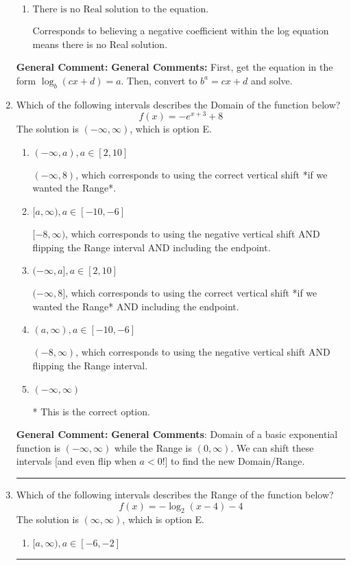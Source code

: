 \documentclass{extbook}[14pt]
\newcommand{\litem}[1]{\item #1

\rule{\textwidth}{0.4pt}}
\begin{document}
\begin{enumerate}
{\begin{enumerate}[label=\Alph*.]
$x = 5.000$, which corresponds to ignoring the vertical shift when converting to exponential form.
\item \( \text{There is no Real solution to the equation.} \)

Corresponds to believing a negative coefficient within the log equation means there is no Real solution.
\end{enumerate}

\textbf{General Comment:} \textbf{General Comments:} First, get the equation in the form $\log_b{(cx+d)} = a$. Then, convert to $b^a = cx+d$ and solve.
}
\litem{
Which of the following intervals describes the Domain of the function below?
\[ f(x) = -e^{x+3}+8 \]The solution is \( (-\infty, \infty) \), which is option E.\begin{enumerate}[label=\Alph*.]
\item \( (-\infty, a), a \in [2, 10] \)

$(-\infty, 8)$, which corresponds to using the correct vertical shift *if we wanted the Range*.
\item \( [a, \infty), a \in [-10, -6] \)

$[-8, \infty)$, which corresponds to using the negative vertical shift AND flipping the Range interval AND including the endpoint.
\item \( (-\infty, a], a \in [2, 10] \)

$(-\infty, 8]$, which corresponds to using the correct vertical shift *if we wanted the Range* AND including the endpoint.
\item \( (a, \infty), a \in [-10, -6] \)

$(-8, \infty)$, which corresponds to using the negative vertical shift AND flipping the Range interval.
\item \( (-\infty, \infty) \)

* This is the correct option.
\end{enumerate}

\textbf{General Comment:} \textbf{General Comments}: Domain of a basic exponential function is $(-\infty, \infty)$ while the Range is $(0, \infty)$. We can shift these intervals [and even flip when $a<0$!] to find the new Domain/Range.
}
\litem{
Which of the following intervals describes the Range of the function below?
\[ f(x) = -\log_2{(x-4)}-4 \]The solution is \( (\infty, \infty) \), which is option E.\begin{enumerate}[label=\Alph*.]
\item \( [a, \infty), a \in [-6, -2] \)


\end{enumerate}}
\end{enumerate}
\end{document}
